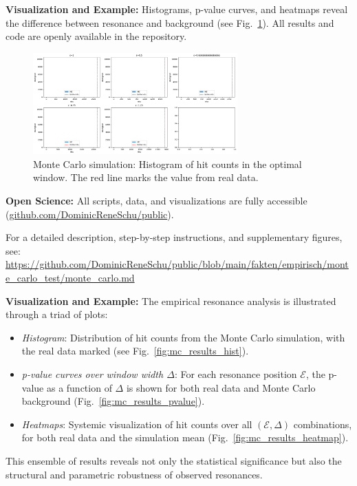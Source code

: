 \documentclass[12pt]{article}
\begin{document}
	\textbf{Visualization and Example:}  
	Histograms, p-value curves, and heatmaps reveal the difference between resonance and background (see Fig.~\ref{fig:mc_results}). All results and code are openly available in the repository.
	
	\begin{figure}[ht]
		\centering
		\includegraphics[width=0.7\textwidth]{figures/hist_mc_vs_real_hits.png}
		\caption{Monte Carlo simulation: Histogram of hit counts in the optimal window. The red line marks the value from real data.}
		\label{fig:mc_results}
	\end{figure}
	
	\textbf{Open Science:}  
	All scripts, data, and visualizations are fully accessible (\href{https://github.com/DominicReneSchu/public/tree/main/fakten/empirisch/monte_carlo_test}{github.com/DominicReneSchu/public}).
	
	\medskip
	
	For a detailed description, step-by-step instructions, and supplementary figures, see:\\
	\url{https://github.com/DominicReneSchu/public/blob/main/fakten/empirisch/monte_carlo_test/monte_carlo.md}
	
	
	\textbf{Visualization and Example:}  
	The empirical resonance analysis is illustrated through a triad of plots:
	\begin{itemize}
		\item \textit{Histogram}: Distribution of hit counts from the Monte Carlo simulation, with the real data marked (see Fig.~\ref{fig:mc_results_hist}).
		\item \textit{p-value curves over window width $\Delta$}: For each resonance position $\mathcal{E}$, the p-value as a function of $\Delta$ is shown for both real data and Monte Carlo background (Fig.~\ref{fig:mc_results_pvalue}).
		\item \textit{Heatmaps}: Systemic visualization of hit counts over all $(\mathcal{E}, \Delta)$ combinations, for both real data and the simulation mean (Fig.~\ref{fig:mc_results_heatmap}).
	\end{itemize}
	This ensemble of results reveals not only the statistical significance but also the structural and parametric robustness of observed resonances.
	
\end{document}
